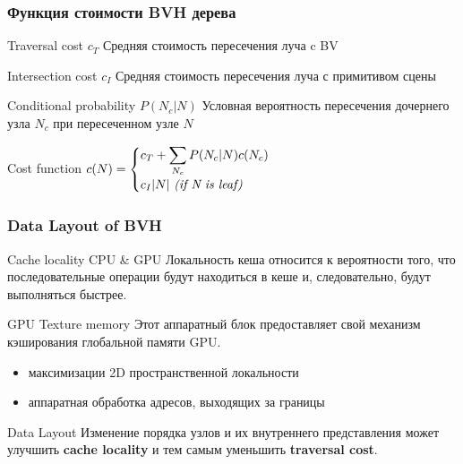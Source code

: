 \documentclass{beamer}
\begin{document}
\begin{frame}
    \frametitle{Функция стоимости BVH дерева}
    \begin{block}{Traversal cost \(c_T\) }
        Средняя стоимость пересечения луча c BV
    \end{block}
    \begin{block}{Intersection cost \(c_I\) }
        Средняя стоимость пересечения луча с примитивом сцены
    \end{block}
    \begin{block}{Conditional probability \(P(N_c\lvert N)\) }
        Условная вероятность пересечения дочернего узла \(N_c\) при пересеченном узле \(N\)
    \end{block}
    \begin{block}{Cost function}
        \(
        c(N) = \begin{cases}
            c_T + \displaystyle \sum_{N_c} P(N_c \lvert N)c(N_c)  \\
            c_I \lvert N \rvert\text{ \textit{(if N is leaf)} }
        \end{cases}
        \)
    \end{block}
\end{frame}

\begin{frame}
    \frametitle{Data Layout of BVH}
    \begin{block}{Cache locality CPU \& GPU}
        Локальность кеша относится к вероятности того,
        что последовательные операции будут находиться в кеше и,
        следовательно, будут выполняться быстрее.
    \end{block}
    \begin{block}{GPU Texture memory}
        Этот аппаратный блок предоставляет свой механизм кэширования глобальной памяти GPU.
        \begin{itemize}
            \item
                максимизации 2D пространственной локальности
            \item
                аппаратная обработка адресов, выходящих за границы
        \end{itemize}
    \end{block}
    \begin{block}{Data Layout}
        Изменение порядка узлов и их внутреннего представления может улучшить \textbf{cache locality}
        и тем самым уменьшить \textbf{traversal cost}.
    \end{block}
\end{frame}
\end{document}
